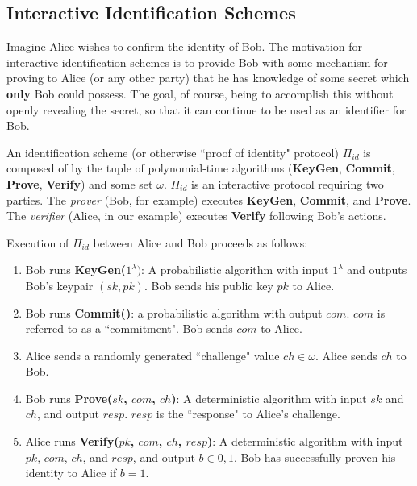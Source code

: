 \subsection{Interactive Identification Schemes}

Imagine Alice wishes to confirm the identity of Bob. The motivation for interactive identification schemes is to provide Bob with some mechanism for proving to Alice (or any other party) that he has knowledge of some secret which \textbf{only} Bob could possess. The goal, of course, being to accomplish this without openly revealing the secret, so that it can continue to be used as an identifier for Bob. 

An identification scheme (or otherwise ``proof of identity" protocol) $\Pi_{id}$ is composed of by the tuple of polynomial-time algorithms (\textbf{KeyGen}, \textbf{Commit}, \textbf{Prove}, \textbf{Verify}) and some set $\omega$. $\Pi_{id}$ is an interactive protocol requiring two parties. The \emph{prover} (Bob, for example) executes \textbf{KeyGen}, \textbf{Commit}, and \textbf{Prove}. The \emph{verifier} (Alice, in our example) executes \textbf{Verify} following Bob's actions. 

Execution of $\Pi_{id}$ between Alice and Bob proceeds as follows:
\begin{enumerate}[label=(\roman*)]
\item Bob runs \textbf{KeyGen($1^\lambda)$}: A probabilistic algorithm with input $1^\lambda$ and outputs Bob's keypair $(sk,pk)$. Bob sends his public key $pk$ to Alice.
\item Bob runs \textbf{Commit()}: a probabilistic algorithm with output $com$. $com$ is referred to as a ``commitment". Bob sends $com$ to Alice.
\item Alice sends a randomly generated ``challenge" value $ch \in \omega$. Alice sends $ch$ to Bob. 
\item Bob runs \textbf{Prove($sk$, $com$, $ch$)}: A deterministic algorithm with input $sk$ and $ch$, and output $resp$. $resp$ is the ``response" to Alice's challenge.
\item Alice runs \textbf{Verify($pk$, $com$, $ch$, $resp$)}: A deterministic algorithm with input $pk$, $com$, $ch$, and $resp$, and output $b \in {0,1}$. Bob has successfully proven his identity to Alice if $b = 1$.
\end{enumerate}


